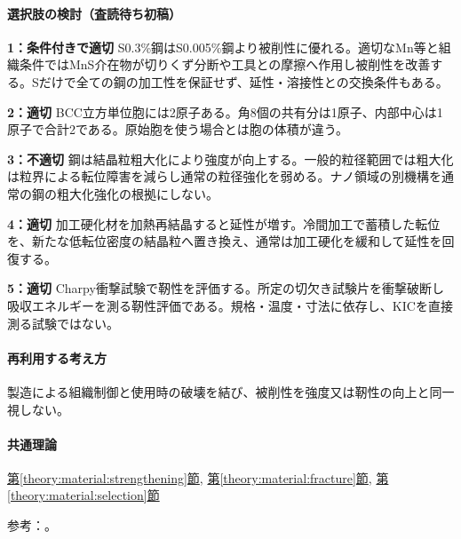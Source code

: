 \paragraph{選択肢の検討（査読待ち初稿）}\mbox{}\par

\noindent\textbf{1：条件付きで適切} S0.3\%鋼はS0.005\%鋼より被削性に優れる。適切なMn等と組織条件ではMnS介在物が切りくず分断や工具との摩擦へ作用し被削性を改善する。Sだけで全ての鋼の加工性を保証せず、延性・溶接性との交換条件もある。\par

\noindent\textbf{2：適切} BCC立方単位胞には2原子ある。角8個の共有分は1原子、内部中心は1原子で合計2である。原始胞を使う場合とは胞の体積が違う。\par

\noindent\textbf{3：不適切} 鋼は結晶粒粗大化により強度が向上する。一般的粒径範囲では粗大化は粒界による転位障害を減らし通常の粒径強化を弱める。ナノ領域の別機構を通常の鋼の粗大化強化の根拠にしない。\par

\noindent\textbf{4：適切} 加工硬化材を加熱再結晶すると延性が増す。冷間加工で蓄積した転位を、新たな低転位密度の結晶粒へ置き換え、通常は加工硬化を緩和して延性を回復する。\par

\noindent\textbf{5：適切} Charpy衝撃試験で靭性を評価する。所定の切欠き試験片を衝撃破断し吸収エネルギーを測る靭性評価である。規格・温度・寸法に依存し、KICを直接測る試験ではない。\par

\paragraph{再利用する考え方} 製造による組織制御と使用時の破壊を結び、被削性を強度又は靭性の向上と同一視しない。

\paragraph{共通理論} \hyperref[theory:material:strengthening]{第\ref*{theory:material:strengthening}節}, \hyperref[theory:material:fracture]{第\ref*{theory:material:fracture}節}, \hyperref[theory:material:selection]{第\ref*{theory:material:selection}節}

\par 参考：\cite{mit_material_dislocations2001,sulfur_machinability2004,nist_charpy,hall_petch_limits2020}。

